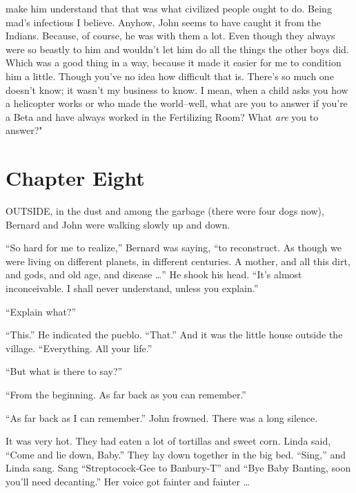 \documentclass[12pt]{report}
\newcommand{\mychapter}[2]{
\setcounter{chapter}{#1}
    \setcounter{section}{0}
    \chapter*{#2}
    \addcontentsline{toc}{chapter}{#2}
}
\begin{document}
make him understand that that was what civilized people ought to do.
Being mad's infectious I believe. Anyhow, John seems to have caught it
from the Indians. Because, of course, he was with them a lot. Even
though they always were so beastly to him and wouldn't let him do all
the things the other boys did. Which was a good thing in a way, because
it made it easier for me to condition him a little. Though you've no
idea how difficult that is. There's so much one doesn't know; it wasn't
my business to know. I mean, when a child asks you how a helicopter
works or who made the world--well, what are you to answer if you're a
Beta and have always worked in the Fertilizing Room? What \emph{are} you
to answer?"

\mychapter{8}{Chapter Eight}
OUTSIDE, in the dust and among the garbage (there were four dogs now),
Bernard and John were walking slowly up and down.

``So hard for me to realize,'' Bernard was saying, ``to reconstruct. As
though we were living on different planets, in different centuries. A
mother, and all this dirt, and gods, and old age, and disease \ldots{}''
He shook his head. ``It's almost inconceivable. I shall never
understand, unless you explain.''

``Explain what?''

``This.'' He indicated the pueblo. ``That.'' And it was the little house
outside the village. ``Everything. All your life.''

``But what is there to say?''

``From the beginning. As far back as you can remember.''

``As far back as I can remember.'' John frowned. There was a long
silence.

It was very hot. They had eaten a lot of tortillas and sweet corn. Linda
said, ``Come and lie down, Baby.'' They lay down together in the big
bed. ``Sing,'' and Linda sang. Sang ``Streptocock-Gee to Banbury-T'' and
``Bye Baby Banting, soon you'll need decanting.'' Her voice got fainter
and fainter \ldots{}
\end{document}
